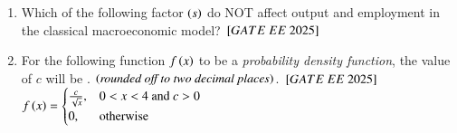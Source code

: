 \documentclass[journal,12pt,onecolumn]{IEEEtran}
\theoremstyle{remark}
\begin{document}
\begin{enumerate}
\item Which of the following factor $\left(s\right)$ do NOT affect output and employment in the classical macroeconomic model?
\hfill $\sbrak{GATE\ EE\ 2025}$
    \begin{enumerate}
      \end{enumerate}
 
\item For the following function $f \left(x\right)$ to be a \textit{probability density function}, the value of $c$ will be \underline{\hspace{2cm}}.  $\left(\textit{rounded off to two decimal places}\right)$.
\hfill $\sbrak{GATE\ EE\ 2025}$ \\
$
f \left(x\right) =
  \begin{cases}
    \frac{c}{\sqrt{x}}, & 0 < x < 4\text{ and } c > 0 \\
    0, & \text{otherwise}
  \end{cases}$
 

\end{enumerate}
\end{document}
